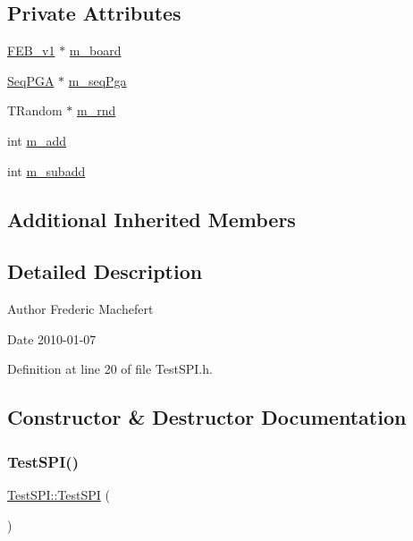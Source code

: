 \subsection*{Private Attributes}
\begin{DoxyCompactItemize}
\item 
\hyperlink{classFEB__v1}{F\+E\+B\+\_\+v1} $\ast$ \hyperlink{classTestSPI_a2852d24b4449df4c3722c25c7d9e08d4}{m\+\_\+board}
\item 
\hyperlink{classSeqPGA}{Seq\+P\+GA} $\ast$ \hyperlink{classTestSPI_aab9cccf2a1594a2539b11d6c637389b0}{m\+\_\+seq\+Pga}
\item 
T\+Random $\ast$ \hyperlink{classTestSPI_a6dd3f4705c0fc8f36a3e71e67517e1cc}{m\+\_\+rnd}
\item 
int \hyperlink{classTestSPI_aa30affe50de58083b1dcca878903b0a7}{m\+\_\+add}
\item 
int \hyperlink{classTestSPI_a4bc59347208b4a5ae97188bdcfc31da2}{m\+\_\+subadd}
\end{DoxyCompactItemize}
\subsection*{Additional Inherited Members}


\subsection{Detailed Description}
\begin{DoxyAuthor}{Author}
Frederic Machefert 
\end{DoxyAuthor}
\begin{DoxyDate}{Date}
2010-\/01-\/07 
\end{DoxyDate}


Definition at line 20 of file Test\+S\+P\+I.\+h.



\subsection{Constructor \& Destructor Documentation}
\mbox{\label{classTestSPI_a0a4bc6b63f406b3c2830c14873b1ce54}} 
\subsubsection{\texorpdfstring{Test\+S\+P\+I()}{TestSPI()}}
{\footnotesize\ttfamily \hyperlink{classTestSPI_1_1TestSPI}{Test\+S\+P\+I\+::\+Test\+S\+PI} (\begin{DoxyParamCaption}{ }\end{DoxyParamCaption})}



